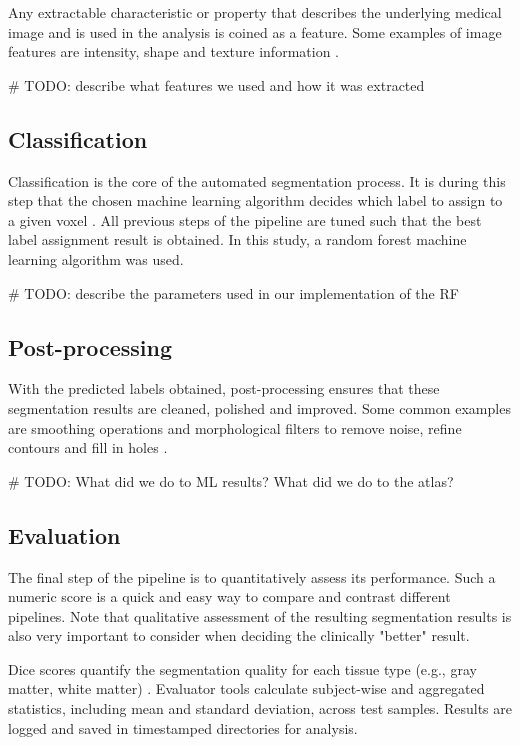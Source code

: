 Any extractable characteristic or property that describes the underlying medical image and is used in the analysis is coined as a feature. Some examples of image features are intensity, shape and texture information \cite{b8}.

\# TODO: describe what features we used and how it was extracted

\subsection{Classification}

Classification is the core of the automated segmentation process. It is during this step that the chosen machine learning algorithm decides which label to assign to a given voxel \cite{b8}. All previous steps of the pipeline are tuned such that the best label assignment result is obtained. In this study, a random forest machine learning algorithm was used.

\# TODO: describe the parameters used in our implementation of the RF

\subsection{Post-processing}

With the predicted labels obtained, post-processing ensures that these segmentation results are cleaned, polished and improved. Some common examples are smoothing operations and morphological filters to remove noise, refine contours and fill in holes \cite{b11}.

\# TODO: What did we do to ML results? What did we do to the atlas?

\subsection{Evaluation}

The final step of the pipeline is to quantitatively assess its performance. Such a numeric score is a quick and easy way to compare and contrast different pipelines. Note that qualitative assessment of the resulting segmentation results is also very important to consider when deciding the clinically "better" result.

Dice scores quantify the segmentation quality for each tissue type (e.g., gray matter, white matter) \cite{b12}. Evaluator tools calculate subject-wise and aggregated statistics, including mean and standard deviation, across test samples. Results are logged and saved in timestamped directories for analysis.


